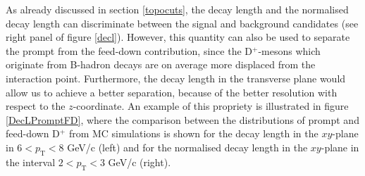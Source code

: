 \documentclass[b5paper,10pt,twoside,oldstyle,classica]{toptesi}
\newcommand{\pt}{p_\text{T}}
\begin{document}
As already discussed in section \ref{topocuts}, the decay length and the normalised decay length can discriminate between the signal and background candidates (see right panel of figure \ref{decl}). However, this quantity can also be used to separate the prompt from the feed-down contribution, since the D$^+$-mesons which originate from B-hadron decays are on average more displaced from the interaction point. Furthermore, the decay length in the transverse plane would allow us to achieve a better separation, because of the better resolution with respect to the $z$-coordinate. An example of this propriety is illustrated in figure \ref{DecLPromptFD}, where the comparison between the distributions of prompt and feed-down D$^+$ from MC simulations is shown for the decay length in the $xy$-plane in $6<\pt<8$ GeV/c (left) and for the normalised decay length in the $xy$-plane in the interval $2<\pt<3$ GeV/c (right). 
\end{document}
